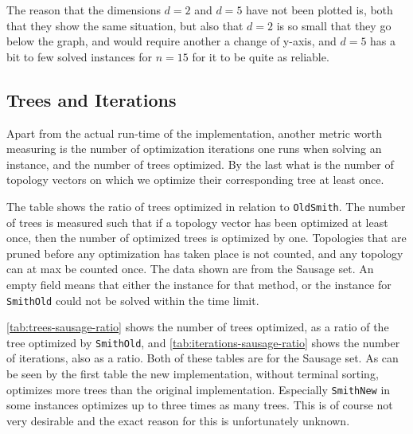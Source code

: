 The reason that the dimensions $d=2$ and $d=5$ have not been plotted is, both
that they show the same situation, but also that $d=2$ is so small that they go
below the graph, and would require another a change of y-axis, and $d=5$ has a
bit to few solved instances for $n=15$ for it to be quite as reliable.

\subsection{Trees and Iterations}
\label{sec:trees-iterations}

Apart from the actual run-time of the implementation, another metric worth
measuring is the number of optimization iterations one runs when solving an
instance, and the number of trees optimized. By the last what is the number of
topology vectors on which we optimize their corresponding tree at least once.

\begin{table}[htbp]
  \centering
  
  \caption[Tree-exploration ratio for Sausage]{The table shows the ratio of
    trees optimized in relation to \texttt{OldSmith}. The number of trees is
    measured such that if a topology vector has been optimized at least once,
    then the number of optimized trees is optimized by one. Topologies that are
    pruned before any optimization has taken place is not counted, and any
    topology can at max be counted once. The data shown are from the Sausage
    set. An empty field means that either the instance for that method, or the
    instance for \texttt{SmithOld} could not be solved within the time
    limit.\label{tab:trees-sausage-ratio}}
\end{table}

\cref{tab:trees-sausage-ratio} shows the number of trees optimized, as a ratio
of the tree optimized by \texttt{SmithOld}, and
\cref{tab:iterations-sausage-ratio} shows the number of iterations, also as a
ratio. Both of these tables are for the Sausage set. As can be seen by the first
table the new implementation, without terminal sorting, optimizes more trees
than the original implementation. Especially \texttt{SmithNew} in some instances
optimizes up to three times as many trees. This is of course not very desirable
and the exact reason for this is unfortunately unknown.

